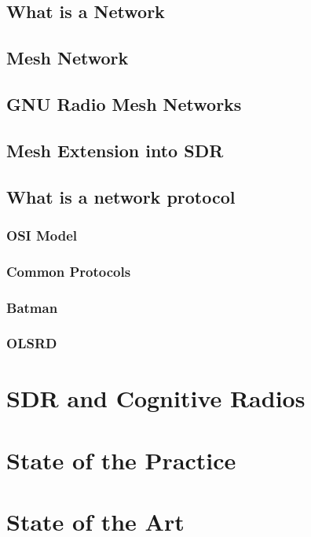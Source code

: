 \subsection{What is a Network}

\subsection{Mesh Network}

\subsection{GNU Radio Mesh Networks}


\subsection{Mesh Extension into SDR}

\subsection{What is a network protocol}

\subsubsection{OSI Model}

\subsubsection{Common Protocols}

\subsubsection{Batman}

\subsubsection{OLSRD}


\section{SDR and Cognitive Radios}


\section{State of the Practice}


\section{State of the Art}

